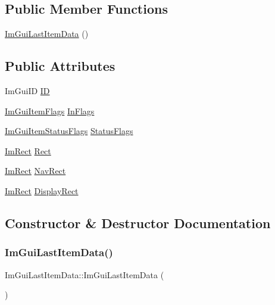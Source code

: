 \subsection*{Public Member Functions}
\begin{DoxyCompactItemize}
\item 
\hyperlink{structImGuiLastItemData_aa613ef14a952dd56b5056c5f7087cc7f}{Im\+Gui\+Last\+Item\+Data} ()
\end{DoxyCompactItemize}
\subsection*{Public Attributes}
\begin{DoxyCompactItemize}
\item 
Im\+Gui\+ID \hyperlink{structImGuiLastItemData_a0d2baf2d2e0933f1006bb47c105c356a}{ID}
\item 
\hyperlink{imgui__internal_8h_abcf9eafab4557e911b2c0d8fe2feeb38}{Im\+Gui\+Item\+Flags} \hyperlink{structImGuiLastItemData_a3aa559c1c783c295b48cacdf22a56d1e}{In\+Flags}
\item 
\hyperlink{imgui__internal_8h_a86b8f9e2fd4084fb2112f003070b53fa}{Im\+Gui\+Item\+Status\+Flags} \hyperlink{structImGuiLastItemData_a31712c73aac65b9ecd049308c511ed3b}{Status\+Flags}
\item 
\hyperlink{structImRect}{Im\+Rect} \hyperlink{structImGuiLastItemData_ad6ff8db4173ff40874ef015e58d726ae}{Rect}
\item 
\hyperlink{structImRect}{Im\+Rect} \hyperlink{structImGuiLastItemData_a3cc19e619fb0f0ac5f410e32a0ff34ca}{Nav\+Rect}
\item 
\hyperlink{structImRect}{Im\+Rect} \hyperlink{structImGuiLastItemData_ae4b3a4f52ea710910ef8c2365fdab79e}{Display\+Rect}
\end{DoxyCompactItemize}


\subsection{Constructor \& Destructor Documentation}
\mbox{\label{structImGuiLastItemData_aa613ef14a952dd56b5056c5f7087cc7f}} 
\subsubsection{\texorpdfstring{Im\+Gui\+Last\+Item\+Data()}{ImGuiLastItemData()}}
{\footnotesize\ttfamily Im\+Gui\+Last\+Item\+Data\+::\+Im\+Gui\+Last\+Item\+Data (\begin{DoxyParamCaption}{ }\end{DoxyParamCaption})\hspace{0.3cm}{\ttfamily [inline]}}



